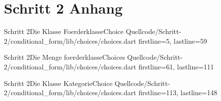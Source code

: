 \section{Schritt 2 Anhang} 
\label{appendix:Schritt1Anhang}

\begin{alexlisting}{Schritt 2}{Die Klasse FoerderklasseChoice}
    {Quellcode/Schritt-2/conditional_form/lib/choices/choices.dart}
    {firstline=5, lastline=59}
    \label{lst:Schritt2KlasseFoerderklasseChoice}
\end{alexlisting}

\begin{alexlisting}{Schritt 2}{Die Menge foerderklasseChoices}
    {Quellcode/Schritt-2/conditional_form/lib/choices/choices.dart}
    {firstline=61, lastline=111}
    \label{lst:Schritt2DieMengeFoerderklasseChoices}
\end{alexlisting}


\begin{alexlisting}{Schritt 2}{Die Klasse KategorieChoice}
    {Quellcode/Schritt-2/conditional_form/lib/choices/choices.dart}
    {firstline=113, lastline=148}
    \label{lst:Schritt2KlasseKategorieChoice}
\end{alexlisting}